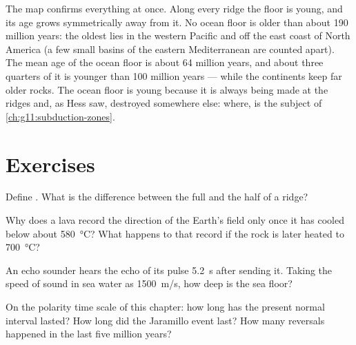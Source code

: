 The map confirms everything at once. Along every ridge the floor is young,
and its age grows symmetrically away from it. No ocean floor is older than
about \num{190} million years: the oldest lies in the western Pacific and off
the east coast of North America (a few small basins of the eastern
Mediterranean are counted apart). The mean age of the ocean floor is about
\num{64} million years, and about three quarters of it is younger than 100
million years --- while the continents keep far older rocks. The
ocean floor is young because it is always being made at the ridges and, as
Hess saw, destroyed somewhere else: where, is the subject of
\cref{ch:g11:subduction-zones}.

\section{Exercises}

\begin{exercise}[$\star$]\label{exo:g11:drift-to-spreading:1}
Define . What is the difference between the full and the
half  of a ridge?
\end{exercise}

\begin{exercise}[$\star$]\label{exo:g11:drift-to-spreading:2}
Why does a lava record the direction of the Earth's field only once it has
cooled below about \qty{580}{\celsius}? What happens to that record if the
rock is later heated to \qty{700}{\celsius}?
\end{exercise}

\begin{exercise}[$\star$]\label{exo:g11:drift-to-spreading:3}
An echo sounder hears the echo of its pulse \qty{5.2}{s} after sending it.
Taking the speed of sound in sea water as \qty{1500}{m/s}, how deep is the
sea floor?
\end{exercise}

\begin{exercise}[$\star$]\label{exo:g11:drift-to-spreading:4}
On the polarity time scale of this chapter: how long has the present normal
interval lasted? How long did the Jaramillo event last? How many reversals
happened in the last five million years?
\end{exercise}

